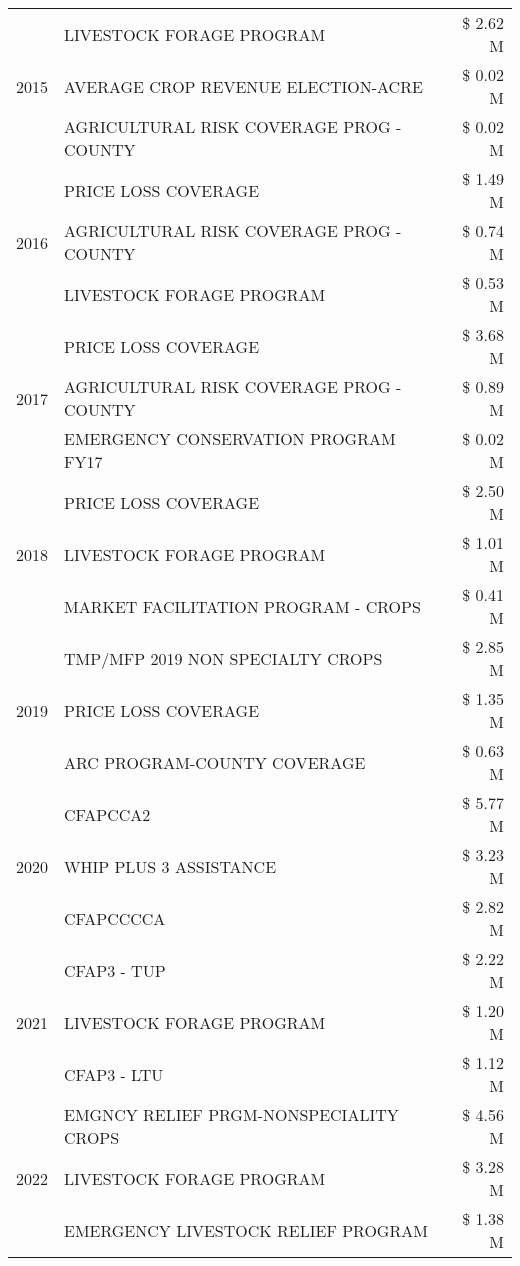 \begin{tabular}{llr}
\cline{1-3}
\multirow[t]{3}{*}{2015} & LIVESTOCK FORAGE PROGRAM & \$ 2.62 M \\
 & AVERAGE CROP REVENUE ELECTION-ACRE & \$ 0.02 M \\
 & AGRICULTURAL RISK COVERAGE PROG - COUNTY & \$ 0.02 M \\
\cline{1-3}
\multirow[t]{3}{*}{2016} & PRICE LOSS COVERAGE & \$ 1.49 M \\
 & AGRICULTURAL RISK COVERAGE PROG - COUNTY & \$ 0.74 M \\
 & LIVESTOCK FORAGE PROGRAM & \$ 0.53 M \\
\cline{1-3}
\multirow[t]{3}{*}{2017} & PRICE LOSS COVERAGE & \$ 3.68 M \\
 & AGRICULTURAL RISK COVERAGE PROG - COUNTY & \$ 0.89 M \\
 & EMERGENCY CONSERVATION PROGRAM FY17 & \$ 0.02 M \\
\cline{1-3}
\multirow[t]{3}{*}{2018} & PRICE LOSS COVERAGE & \$ 2.50 M \\
 & LIVESTOCK FORAGE PROGRAM & \$ 1.01 M \\
 & MARKET FACILITATION PROGRAM - CROPS & \$ 0.41 M \\
\cline{1-3}
\multirow[t]{3}{*}{2019} & TMP/MFP 2019 NON SPECIALTY CROPS & \$ 2.85 M \\
 & PRICE LOSS COVERAGE & \$ 1.35 M \\
 & ARC PROGRAM-COUNTY COVERAGE & \$ 0.63 M \\
\cline{1-3}
\multirow[t]{3}{*}{2020} & CFAPCCA2 & \$ 5.77 M \\
 & WHIP PLUS 3 ASSISTANCE & \$ 3.23 M \\
 & CFAPCCCCA & \$ 2.82 M \\
\cline{1-3}
\multirow[t]{3}{*}{2021} & CFAP3 - TUP & \$ 2.22 M \\
 & LIVESTOCK FORAGE PROGRAM & \$ 1.20 M \\
 & CFAP3 - LTU & \$ 1.12 M \\
\cline{1-3}
\multirow[t]{3}{*}{2022} & EMGNCY RELIEF PRGM-NONSPECIALITY CROPS & \$ 4.56 M \\
 & LIVESTOCK FORAGE PROGRAM & \$ 3.28 M \\
 & EMERGENCY LIVESTOCK RELIEF PROGRAM & \$ 1.38 M \\
\cline{1-3}
\bottomrule
\end{tabular}
